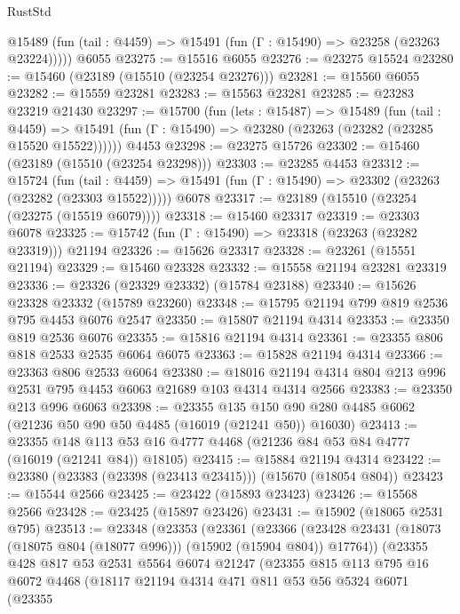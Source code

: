 \begin{lexlean}{RustStd}
\begin{coremodule}
      @15489 (fun (tail : @4459) => @15491 (fun (Γ : @15490) => @23258 (@23263 @23224)))))
    @6055
@23275 := @15516 @6055
@23276 := @23275 @15524
@23280 := @15460 (@23189 (@15510 (@23254 @23276)))
@23281 := @15560 @6055
@23282 := @15559 @23281
@23283 := @15563 @23281
@23285 := @23283 @23219 @21430
@23297 := @15700
    (fun (lets : @15487) =>
    @15489
      (fun (tail : @4459) =>
      @15491 (fun (Γ : @15490) => @23280 (@23263 (@23282 (@23285 @15520 @15522))))))
    @4453
@23298 := @23275 @15726
@23302 := @15460 (@23189 (@15510 (@23254 @23298)))
@23303 := @23285 @4453
@23312 := @15724
    (fun (tail : @4459) => @15491 (fun (Γ : @15490) => @23302 (@23263 (@23282 (@23303 @15522)))))
    @6078
@23317 := @23189 (@15510 (@23254 (@23275 (@15519 @6079))))
@23318 := @15460 @23317
@23319 := @23303 @6078
@23325 := @15742 (fun (Γ : @15490) => @23318 (@23263 (@23282 @23319))) @21194
@23326 := @15626 @23317
@23328 := @23261 (@15551 @21194)
@23329 := @15460 @23328
@23332 := @15558 @21194 @23281 @23319
@23336 := @23326 (@23329 @23332) (@15784 @23188)
@23340 := @15626 @23328 @23332 (@15789 @23260)
@23348 := @15795 @21194 @799 @819 @2536 @795 @4453 @6076 @2547
@23350 := @15807 @21194 @4314
@23353 := @23350 @819 @2536 @6076
@23355 := @15816 @21194 @4314
@23361 := @23355 @806 @818 @2533 @2535 @6064 @6075
@23363 := @15828 @21194 @4314
@23366 := @23363 @806 @2533 @6064
@23380 := @18016 @21194 @4314 @804 @213 @996 @2531 @795 @4453 @6063 @21689 @103 @4314 @4314 @2566
@23383 := @23350 @213 @996 @6063
@23398 := @23355
    @135
    @150
    @90
    @280
    @4485
    @6062
    (@21236 @50 @90 @50 @4485 (@16019 (@21241 @50)) @16030)
@23413 := @23355
    @148
    @113
    @53
    @16
    @4777
    @4468
    (@21236 @84 @53 @84 @4777 (@16019 (@21241 @84)) @18105)
@23415 := @15884 @21194 @4314
@23422 := @23380 (@23383 (@23398 (@23413 @23415))) (@15670 (@18054 @804))
@23423 := @15544 @2566
@23425 := @23422 (@15893 @23423)
@23426 := @15568 @2566
@23428 := @23425 (@15897 @23426)
@23431 := @15902 (@18065 @2531 @795)
@23513 := @23348
    (@23353
      (@23361
        (@23366 (@23428 @23431 (@18073 (@18075 @804 (@18077 @996))) (@15902 (@15904 @804)) @17764))
        (@23355
          @428
          @817
          @53
          @2531
          @5564
          @6074
          @21247
          (@23355
            @815
            @113
            @795
            @16
            @6072
            @4468
            (@18117
              @21194
              @4314
              @471
              @811
              @53
              @56
              @5324
              @6071
              (@23355

\end{coremodule}
\end{lexlean}
